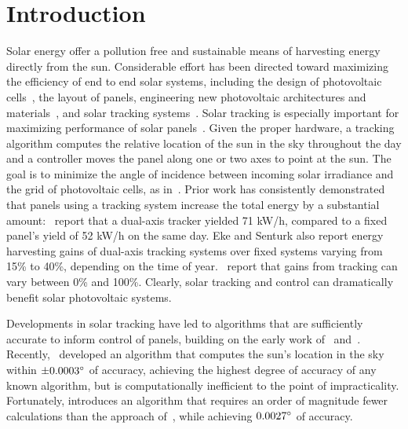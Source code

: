 \documentclass[11pt]{article}
\begin{document}
\section{Introduction}
Solar energy offer a pollution free and sustainable means of harvesting energy directly from the sun. Considerable effort has been directed toward maximizing the efficiency of end to end solar systems, including the design of photovoltaic cells~\cite{Jervase2001,li2012molecular}, the layout of panels, engineering new photovoltaic architectures and materials~\cite{li2005high}, and solar tracking systems~\cite{camacho2012control,hua2004modified}. Solar tracking is especially important for maximizing performance of solar panels~\cite{Eke2012,Rizk2008,King2001}. Given the proper hardware, a tracking algorithm computes the relative location of the sun in the sky throughout the day and a controller moves the panel along one or two axes to point at the sun. The goal is to minimize the angle of incidence between incoming solar irradiance and the grid of photovoltaic cells, as in~\citet{Eke2012,Benghanem2011,King2001, kalogirou1996design}. Prior work has consistently demonstrated that panels using a tracking system increase the total energy by a substantial amount:~\citet{Eke2012} report that a dual-axis tracker yielded 71 kW/h, compared to a fixed panel's yield of 52 kW/h on the same day. Eke and Senturk also report energy harvesting gains of dual-axis tracking systems over fixed systems varying from 15\% to 40\%, depending on the time of year.~\citet{mousazadeh2009review} report that gains from tracking can vary between 0\% and 100\%. Clearly, solar tracking and control can dramatically benefit solar photovoltaic systems.

Developments in solar tracking have led to algorithms that are sufficiently accurate to inform control of panels, building on the early work of~\citet{spencer1971fourier,walraven1978calculating} and~\citet{michalsky1988astronomical}. Recently,~\citet{reda2004solar} developed an algorithm that computes the sun's location in the sky within $\pm 0.0003\degree$ of accuracy, achieving the highest degree of accuracy of any known algorithm, but is computationally inefficient to the point of impracticality. Fortunately, \citet{Grena2008} introduces an algorithm that requires an order of magnitude fewer calculations than the approach of~\citet{reda2004solar}, while achieving $0.0027\degree$ of accuracy.
\end{document}
